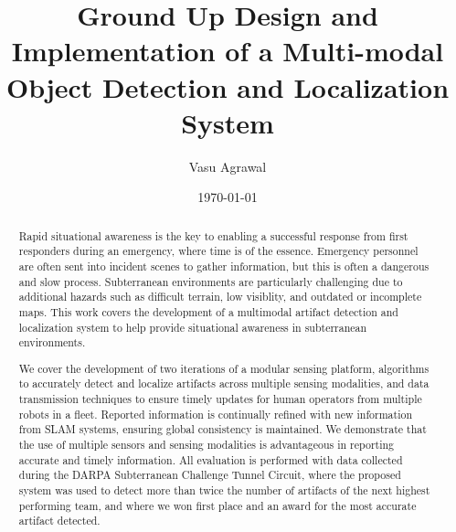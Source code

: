 \documentclass[12pt]{cmuthesis}
\begin{document}
 
\frontmatter

\pagestyle{empty}

\title{ %
{\bf Ground Up Design and Implementation of a Multi-modal Object Detection and Localization System}}
\author{Vasu Agrawal}
\date{\today}


\support{}
\disclaimer{}



\maketitle

\pagestyle{plain} %


\begin{abstract}
Rapid situational awareness is the key to enabling a successful response from first responders during an emergency, where time is of the essence. Emergency personnel are often sent into incident scenes to gather information, but this is often a dangerous and slow process. Subterranean environments are particularly challenging due to additional hazards such as difficult terrain, low visiblity, and outdated or incomplete maps. This work covers the development of a multimodal artifact detection and localization system to help provide situational awareness in subterranean environments.

We cover the development of two iterations of a modular sensing platform, algorithms to accurately detect and localize artifacts across multiple sensing modalities, and data transmission techniques to ensure timely updates for human operators from multiple robots in a fleet. Reported information is continually refined with new information from SLAM systems, ensuring global consistency is maintained. We demonstrate that the use of multiple sensors and sensing modalities is advantageous in reporting accurate and timely information. All evaluation is performed with data collected during the DARPA Subterranean Challenge Tunnel Circuit, where the proposed system was used to detect more than twice the number of artifacts of the next highest performing team, and where we won first place and an award for the most accurate artifact detected.
\end{abstract}
\end{document}
